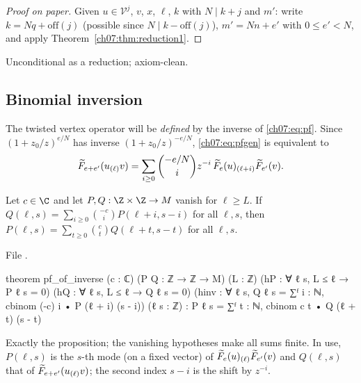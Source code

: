 \begin{proof}[Proof on paper]
Given $u\in\mathcal V^j$, $v$, $x$, $\ell$, $k$ with $N\mid k+j$ and $m'$: write
$k = Nq+\mathrm{off}(j)$ (possible since $N\mid k-\mathrm{off}(j)$), $m' = Nn+e'$ with
$0\le e'<N$, and apply Theorem~\ref{ch07:thm:reduction1}.
\end{proof}

\begin{status}
Unconditional as a reduction; axiom-clean.
\end{status}

\subsection{Binomial inversion}

The twisted vertex operator will be \emph{defined} by the inverse of \eqref{ch07:eq:pf}. Since
$(1+z_0/z)^{e/N}$ has inverse $(1+z_0/z)^{-e/N}$, \eqref{ch07:eq:pfgen} is equivalent to
\begin{equation}\label{ch07:eq:pfinv}
  \widetilde{F}_{e+e'}(u_{(\ell)}v) = \sum_{i\ge0}\binom{-e/N}{i}z^{-i}\,
  \widetilde{F}_e(u)_{(\ell+i)}\widetilde{F}_{e'}(v).
\end{equation}

\begin{proposition}\label{ch07:prop:inverse}
Let $c\in\C$ and let $P,Q:\Z\times\Z\to M$ vanish for $\ell\ge L$. If $Q(\ell,s) = \sum_{i\ge0}
\binom{-c}{i}P(\ell+i,s-i)$ for all $\ell,s$, then $P(\ell,s) = \sum_{t\ge0}\binom ct
Q(\ell+t,s-t)$ for all $\ell, s$.
\end{proposition}

\noindent File .
\begin{leancode}
theorem pf_of_inverse (c : ℂ) (P Q : ℤ → ℤ → M) (L : ℤ)
    (hP : ∀ ℓ s, L ≤ ℓ → P ℓ s = 0) (hQ : ∀ ℓ s, L ≤ ℓ → Q ℓ s = 0)
    (hinv : ∀ ℓ s, Q ℓ s = ∑ᶠ i : ℕ, cbinom (-c) i • P (ℓ + i) (s - i)) (ℓ s : ℤ) :
    P ℓ s = ∑ᶠ t : ℕ, cbinom c t • Q (ℓ + t) (s - t)
\end{leancode}

\begin{dictionary}
Exactly the proposition; the vanishing hypotheses make all sums finite. In use, $P(\ell,s)$ is
the $s$-th mode (on a fixed vector) of $\widetilde{F}_e(u)_{(\ell)}\widetilde{F}_{e'}(v)$ and
$Q(\ell,s)$ that of $\widetilde{F}_{e+e'}(u_{(\ell)}v)$; the second index $s-i$ is the shift by
$z^{-i}$.
\end{dictionary}

